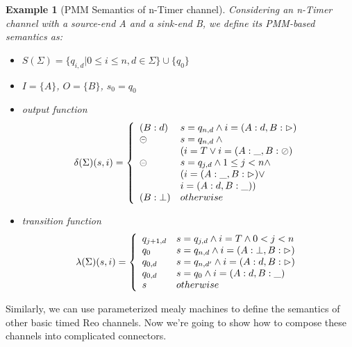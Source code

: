 \documentclass[conference, a4paper]{IEEEtran}
\newtheorem{example}{Example}
\newcommand{\rblock}[0]{\circleddash}
\newcommand{\rread}[0]{\rhd}
\newcommand{\rnoread}[0]{\oslash}
\begin{document}
\begin{example}[PMM Semantics of n-Timer channel]
  Considering an n-Timer channel with a source-end A and a sink-end B, we define its PMM-based
  semantics as:
  \begin{itemize}
    \item[-] $S(\Sigma)=\{q_{i,d}|0\leq i\leq n, d\in \Sigma\}\cup\{q_0\}$
    \item[-] $I=\{A\}$, $O=\{B\}$, $s_0=q_0$
    \item[-] output function
      \begin{displaymath}
        \delta(\Sigma)(s,i)=\left\{
        \begin{array}[ht]{ll}
          (B:d) & s=q_{n,d}\land i=(A:d,B:\rread)\\
          \rblock & s=q_{n,d}\:\land \\
          & (i=T\lor i=(A:\_,B:\rnoread) \\
          \rblock & s=q_{j,d}\land 1 \leq j < n\land \\
          & (i=(A:\_,B:\rread)\lor \\
          & i=(A:d,B:\_))\\
          (B:\bot) & otherwise\\
        \end{array}
        \right.
      \end{displaymath}
    \item[-] transition function
      \begin{displaymath}
        \lambda(\Sigma)(s,i)=\left\{
        \begin{array}[ht]{ll}
          q_{j+1,d} & s=q_{j,d}\land i=T\land0 < j < n\\
          q_0 & s=q_{n,d}\land i=(A:\bot,B:\rread) \\
          q_{0,d} & s=q_{n,d'}\land i=(A:d,B:\rread) \\
          q_{0,d} & s=q_0 \land i=(A:d,B:\_) \\
          s & otherwise \\
        \end{array}
        \right.
      \end{displaymath}
  \end{itemize}
\end{example}

Similarly, we can use parameterized mealy machines to define the semantics of other basic timed Reo
channels. Now we're going to show how to compose these channels into complicated connectors.
\end{document}
